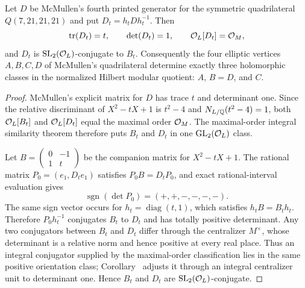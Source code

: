\begin{proposition}\label{prop:DBsame}
Let $D$ be McMullen's fourth printed generator for the symmetric quadrilateral $Q(7,21,21,21)$ and put $D_t=h_tDh_t^{-1}$.  Then
\[
 \operatorname{tr}(D_t)=t,\qquad \det(D_t)=1,\qquad \mathcal O_L[D_t]=\mathcal O_M,
\]
and $D_t$ is $\mathrm{SL}_2(\mathcal O_L)$-conjugate to $B_t$.  Consequently the four elliptic vertices $A,B,C,D$ of McMullen's quadrilateral determine exactly three holomorphic classes in the normalized Hilbert modular quotient: $A$, $B=D$, and $C$.
\end{proposition}
\begin{proof}
McMullen's explicit matrix for $D$ has trace $t$ and determinant one.  Since the relative discriminant of $X^2-tX+1$ is $t^2-4$ and $N_{L/\mathbb Q}(t^2-4)=1$, both $\mathcal O_L[B_t]$ and $\mathcal O_L[D_t]$ equal the maximal order $\mathcal O_M$.  The maximal-order integral similarity theorem therefore puts $B_t$ and $D_t$ in one $\mathrm{GL}_2(\mathcal O_L)$ class.

Let $B=\left(\begin{smallmatrix}0&-1\\1&t\end{smallmatrix}\right)$ be the companion matrix for $X^2-tX+1$.  The rational matrix $P_0=(e_1,D_te_1)$ satisfies $P_0B=D_tP_0$, and exact rational-interval evaluation gives
\[
 \operatorname{sgn}(\det P_0)=(+,+,-,-,-,-).
\]
The same sign vector occurs for $h_t=\operatorname{diag}(t,1)$, which satisfies $h_tB=B_th_t$.  Therefore $P_0h_t^{-1}$ conjugates $B_t$ to $D_t$ and has totally positive determinant.  Any two conjugators between $B_t$ and $D_t$ differ through the centralizer $M^\times$, whose determinant is a relative norm and hence positive at every real place.  Thus an integral conjugator supplied by the maximal-order classification lies in the same positive orientation class; Corollary~ adjusts it through an integral centralizer unit to determinant one.  Hence $B_t$ and $D_t$ are $\mathrm{SL}_2(\mathcal O_L)$-conjugate.
\end{proof}


